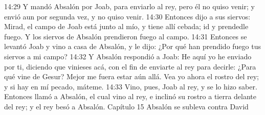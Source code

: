 14:29 Y mandó Absalón por Joab, para enviarlo al rey, pero él no quiso venir; y envió aun por segunda vez, y no quiso venir.  
14:30 Entonces dijo a sus siervos: Mirad, el campo de Joab está junto al mío, y tiene allí cebada; id y prendedle fuego. Y los siervos de Absalón prendieron fuego al campo.  
14:31 Entonces se levantó Joab y vino a casa de Absalón, y le dijo: ¿Por qué han prendido fuego tus siervos a mi campo?  
14:32 Y Absalón respondió a Joab: He aquí yo he enviado por ti, diciendo que vinieses acá, con el fin de enviarte al rey para decirle: ¿Para qué vine de Gesur? Mejor me fuera estar aún allá. Vea yo ahora el rostro del rey; y si hay en mí pecado, máteme.  
14:33 Vino, pues, Joab al rey, y se lo hizo saber. Entonces llamó a Absalón, el cual vino al rey, e inclinó su rostro a tierra delante del rey; y el rey besó a Absalón.  
Capítulo 15
Absalón se subleva contra David  

